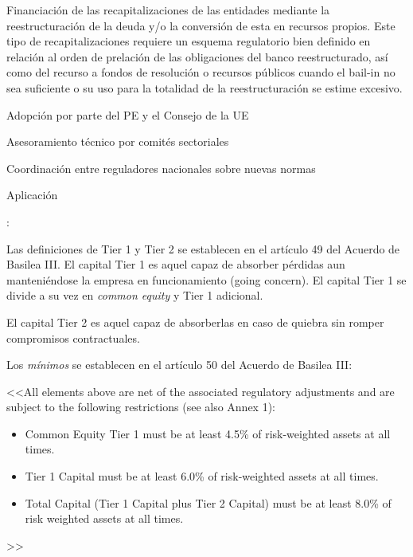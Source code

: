 \documentclass{nuevotema}
\begin{document}

Financiación de las recapitalizaciones de las entidades mediante la reestructuración de la deuda y/o la conversión de esta en recursos propios. Este tipo de recapitalizaciones requiere un esquema regulatorio bien definido en relación al orden de prelación de las obligaciones del banco reestructurado, así como del recurso a fondos de resolución o recursos públicos cuando el bail-in no sea suficiente o su uso para la totalidad de la reestructuración se estime excesivo.

\begin{enumroman}
    \item Adopción por parte del PE y el Consejo de la UE
    \item Asesoramiento técnico por comités sectoriales
    \item Coordinación entre reguladores nacionales sobre nuevas normas
    \item Aplicación
\end{enumroman}

: 

Las definiciones de Tier 1 y Tier 2 se establecen en el artículo 49 del Acuerdo de Basilea III. El capital Tier 1 es aquel capaz de absorber pérdidas aun manteniéndose la empresa en funcionamiento (going concern). El capital Tier 1 se divide a su vez en \textit{common equity} y Tier 1 adicional.

El capital Tier 2 es aquel capaz de absorberlas en caso de quiebra sin romper compromisos contractuales. 

Los \textit{mínimos} se establecen en el artículo 50 del Acuerdo de Basilea III:

<<All elements above are net of the associated regulatory adjustments and are subject
to the following restrictions (see also Annex 1): 

\begin{itemize}
    \item Common Equity Tier 1 must be at least 4.5\% of risk-weighted assets at all times.
    \item Tier 1 Capital must be at least 6.0\% of risk-weighted assets at all times.
    \item Total Capital (Tier 1 Capital plus Tier 2 Capital) must be at least 8.0\% of risk weighted assets at all times.
\end{itemize}
>>


\preguntas

\end{document}

